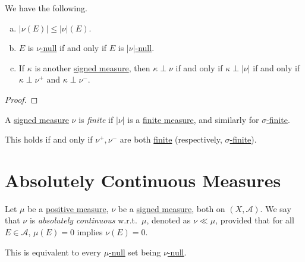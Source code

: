 \begin{lemma}
	We have the following.
	\begin{enumerate}[(a)]
		\item \(\left\vert \nu(E) \right\vert \leq \left\vert \nu \right\vert(E)\).
		\item \(E\) is \hyperref[def:null-set-signed-measure]{\(\nu\)-null} if and only if \(E\) is \hyperref[def:null-set-signed-measure]{\(\left\vert \nu \right\vert\)-null}.
		\item If \(\kappa\) is another \hyperref[def:signed-measure]{signed measure}, then \(\kappa \perp \nu\) if and only if \(\kappa \perp \left\vert \nu \right\vert\) if and only if \(\kappa \perp \nu^+\) and \(\kappa \perp \nu^-\).
	\end{enumerate}
\end{lemma}
\begin{proof}
\end{proof}

\begin{definition}\label{def:finite-signed-measure}
	A \hyperref[def:signed-measure]{signed measure} \(\nu\) is \emph{finite} if \(\left\vert \nu \right\vert\) is a \hyperref[def:finite-measure]{finite measure}, and similarly for \hyperref[def:sigma-finite-measure]{\(\sigma\)-finite}.
\end{definition}

\begin{remark}
	This holds if and only if \(\nu^+,\nu^-\) are both \hyperref[def:finite-measure]{finite} (respectively, \hyperref[def:sigma-finite-measure]{\(\sigma\)-finite}).
\end{remark}

\section{Absolutely Continuous Measures}
\begin{definition}\label{def:absolutely-continuous-measure}
	Let \(\mu\) be a \hyperref[def:signed-measure]{positive measure}, \(\nu\) be a \hyperref[def:signed-measure]{signed measure}, both on \((X, \mathcal{A})\). We say that \(\nu\) is \emph{absolutely continuous} w.r.t.\ \(\mu\), denoted as \(\nu \ll \mu\), provided that for all \(E \in \mathcal{A}\), \(\mu(E) = 0\) implies \(\nu(E) = 0\).
\end{definition}

\begin{remark}
	This is equivalent to every \hyperref[def:null-set-signed-measure]{\(\mu\)-null} set being \hyperref[def:null-set-signed-measure]{\(\nu\)-null}.
\end{remark}

